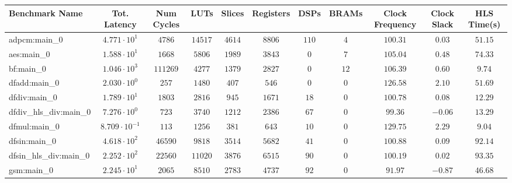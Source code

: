 \begin{tabular}{|l|c|c|c|c|c|c|c|c|c|c|}
\hline
Benchmark Name          & Tot. Latency            & Num Cycles & LUTs      & Slices    & Registers & DSPs    & BRAMs  & Clock Frequency & Clock Slack & HLS Time(s) \\
\hline
adpcm:main\_0           & $ 4.771 \cdot 10^{1}  $ & $ 4786   $ & $ 14517 $ & $ 4614  $ & $ 8806  $ & $ 110 $ & $ 4  $ & $ 100.31      $ & $ 0.03    $ & $ 51.15   $ \\
aes:main\_0             & $ 1.588 \cdot 10^{1}  $ & $ 1668   $ & $ 5806  $ & $ 1989  $ & $ 3843  $ & $ 0   $ & $ 7  $ & $ 105.04      $ & $ 0.48    $ & $ 74.33   $ \\
bf:main\_0              & $ 1.046 \cdot 10^{3}  $ & $ 111269 $ & $ 4277  $ & $ 1379  $ & $ 2827  $ & $ 0   $ & $ 12 $ & $ 106.39      $ & $ 0.60    $ & $ 9.74    $ \\
dfadd:main\_0           & $ 2.030 \cdot 10^{0}  $ & $ 257    $ & $ 1480  $ & $ 407   $ & $ 546   $ & $ 0   $ & $ 0  $ & $ 126.58      $ & $ 2.10    $ & $ 51.69   $ \\
dfdiv:main\_0           & $ 1.789 \cdot 10^{1}  $ & $ 1803   $ & $ 2816  $ & $ 945   $ & $ 1671  $ & $ 18  $ & $ 0  $ & $ 100.78      $ & $ 0.08    $ & $ 12.29   $ \\
dfdiv\_hls\_div:main\_0 & $ 7.276 \cdot 10^{0}  $ & $ 723    $ & $ 3740  $ & $ 1212  $ & $ 2386  $ & $ 67  $ & $ 0  $ & $ 99.36       $ & $ -0.06   $ & $ 13.29   $ \\
dfmul:main\_0           & $ 8.709 \cdot 10^{-1} $ & $ 113    $ & $ 1256  $ & $ 381   $ & $ 643   $ & $ 10  $ & $ 0  $ & $ 129.75      $ & $ 2.29    $ & $ 9.04    $ \\
dfsin:main\_0           & $ 4.618 \cdot 10^{2}  $ & $ 46590  $ & $ 9818  $ & $ 3514  $ & $ 5682  $ & $ 41  $ & $ 0  $ & $ 100.88      $ & $ 0.09    $ & $ 92.14   $ \\
dfsin\_hls\_div:main\_0 & $ 2.252 \cdot 10^{2}  $ & $ 22560  $ & $ 11020 $ & $ 3876  $ & $ 6515  $ & $ 90  $ & $ 0  $ & $ 100.19      $ & $ 0.02    $ & $ 93.35   $ \\
gsm:main\_0             & $ 2.245 \cdot 10^{1}  $ & $ 2065   $ & $ 8510  $ & $ 2783  $ & $ 4737  $ & $ 92  $ & $ 0  $ & $ 91.97       $ & $ -0.87   $ & $ 46.68   $ \\

\end{tabular}
